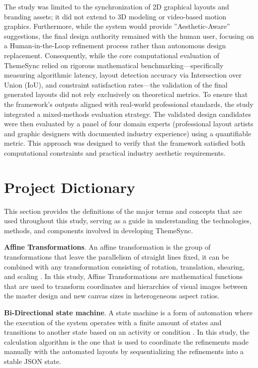 \begin{refsection}
The study was limited to the synchronization of 2D graphical layouts and branding assets; it did not extend to 3D modeling or video-based motion graphics. Furthermore, while the system would provide ”Aesthetic-Aware” suggestions, the final design authority remained with the human user, focusing on a Human-in-the-Loop refinement process rather than autonomous design replacement. Consequently, while the core computational evaluation of ThemeSync relied on rigorous mathematical benchmarking—specifically measuring algorithmic latency, layout detection accuracy via Intersection over Union (IoU), and constraint satisfaction rates—the validation of the final generated layouts did not rely exclusively on theoretical metrics. To ensure that the framework's outputs aligned with real-world professional standards, the study integrated a mixed-methods evaluation strategy. The validated design candidates were then evaluated by a panel of four domain experts (professional layout artists and graphic designers with documented industry experience) using a quantifiable metric. This approach was designed to verify that the framework satisfied both computational constraints and practical industry aesthetic requirements.

\section{Project Dictionary}

 This section provides the definitions of the major terms and concepts that are used throughout this study, serving as a guide in understanding the technologies, methods, and components involved in developing ThemeSync. 

    \textbf{Affine Transformations}. An affine transformation is the group of transformations that leave the parallelism of straight lines fixed, it can be combined with any transformation consisting of rotation, translation, shearing, and scaling \cite{Torpey&Klein2024}. In this study, Affine Transformations are mathematical functions that are used to transform coordinates and hierarchies of visual images between the master design and new canvas sizes in heterogeneous aspect ratios.

    \textbf{Bi-Directional state machine}. A state machine is a form of automation where the execution of the system operates with a finite amount of states and transitions to another state based on an activity or condition \cite{UiPath2024}. In this study, the calculation algorithm is the one that is used to coordinate the refinements made manually with the automated layouts by sequentializing the refinements into a stable JSON state.


\end{refsection}
